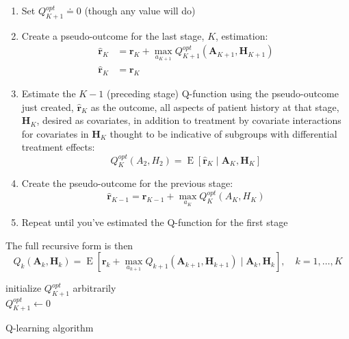 \documentclass[12pt]{article}
\begin{document}
\begin{enumerate}
  \item Set $Q^{opt}_{K + 1} \doteq 0$ (though any value will do)
  \item Create a pseudo-outcome for the last stage, $K$, estimation:
  \begin{align}
    \hat{\bm{r}}_{K} &= \bm{r}_{K} + \max_{a_{K+1}} Q_{K+1}^{opt}(\bm{A}_{K+1}, \bm{H}_{K+1}) \\
    \hat{\bm{r}}_{K} &= \bm{r}_{K}
  \end{align}
  \item Estimate the $K - 1$ (preceding stage) Q-function using the pseudo-outcome just created, $\hat{\bm{r}}_{K}$ as the outcome, all aspects of patient history at that stage, $\bm{H}_{K}$, desired as covariates, in addition to treatment by covariate interactions for covariates in $\bm{H}_{K}$ thought to be indicative of subgroups with differential treatment effects:
  \begin{equation}
      Q_{K}^{opt}(A_{2}, H_{2}) = \operatorname{E}[\hat{\bm{r}}_{K} \mid \bm{A}_{K}, \bm{H}_{K}]
  \end{equation}
  \item Create the pseudo-outcome for the previous stage:
  \begin{equation}
    \hat{\bm{r}}_{K-1} = \bm{r}_{K-1} + \max_{a_K} Q_{K}^{opt}(A_{K}, H_{K})
  \end{equation}
  \item Repeat until you've estimated the Q-function for the first stage
\end{enumerate}

The full recursive form is then 
  \begin{equation}
     Q_{k}(\bm{A}_{k}, \bm{H}_{k})  = \operatorname{E}[\bm{r}_{k} + \max_{a_{k+1}} Q_{k+1}(\bm{A}_{k+1}, \bm{H}_{k+1}) \mid \bm{A}_{k}, \bm{H}_{k}], \quad k = 1, \ldots, K
  \end{equation}


\begin{algorithm}[H]
  initialize $Q_{K + 1}^{opt}$ arbitrarily \\
  $Q_{K + 1}^{opt} \gets 0$ \\
 \caption{Q-learning algorithm}
\end{algorithm}
\end{document}
